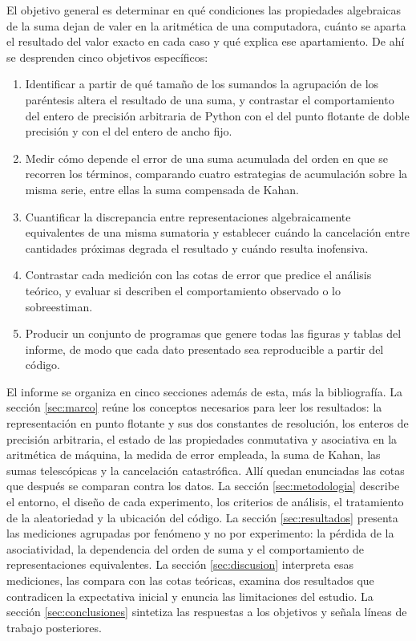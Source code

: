 El objetivo general es determinar en qué condiciones las propiedades algebraicas de la suma dejan de
valer en la aritmética de una computadora, cuánto se aparta el resultado del valor exacto en cada
caso y qué explica ese apartamiento. De ahí se desprenden cinco objetivos específicos:

\begin{enumerate}
  \item Identificar a partir de qué tamaño de los sumandos la agrupación de los paréntesis altera el
  resultado de una suma, y contrastar el comportamiento del entero de precisión arbitraria de Python
  con el del punto flotante de doble precisión y con el del entero de ancho fijo.
  \item Medir cómo depende el error de una suma acumulada del orden en que se recorren los términos,
  comparando cuatro estrategias de acumulación sobre la misma serie, entre ellas la suma compensada
  de Kahan.
  \item Cuantificar la discrepancia entre representaciones algebraicamente equivalentes de una misma
  sumatoria y establecer cuándo la cancelación entre cantidades próximas degrada el resultado y
  cuándo resulta inofensiva.
  \item Contrastar cada medición con las cotas de error que predice el análisis teórico, y evaluar
  si describen el comportamiento observado o lo sobreestiman.
  \item Producir un conjunto de programas que genere todas las figuras y tablas del informe, de modo
  que cada dato presentado sea reproducible a partir del código.
\end{enumerate}

El informe se organiza en cinco secciones además de esta, más la bibliografía. La sección \ref{sec:marco} reúne los
conceptos necesarios para leer los resultados: la representación en punto flotante y sus dos
constantes de resolución, los enteros de precisión arbitraria, el estado de las propiedades
conmutativa y asociativa en la aritmética de máquina, la medida de error empleada, la suma de Kahan,
las sumas telescópicas y la cancelación catastrófica. Allí quedan enunciadas las cotas que después
se comparan contra los datos. La sección \ref{sec:metodologia} describe el entorno, el diseño de
cada experimento, los criterios de análisis, el tratamiento de la aleatoriedad y la ubicación del
código. La sección
\ref{sec:resultados} presenta las mediciones agrupadas por fenómeno y no por experimento: la pérdida
de la asociatividad, la dependencia del orden de suma y el comportamiento de representaciones
equivalentes. La sección \ref{sec:discusion} interpreta esas mediciones, las compara con las cotas
teóricas, examina dos resultados que contradicen la expectativa inicial y enuncia las limitaciones
del estudio. La sección \ref{sec:conclusiones} sintetiza las respuestas a los objetivos y señala
líneas de trabajo posteriores.
